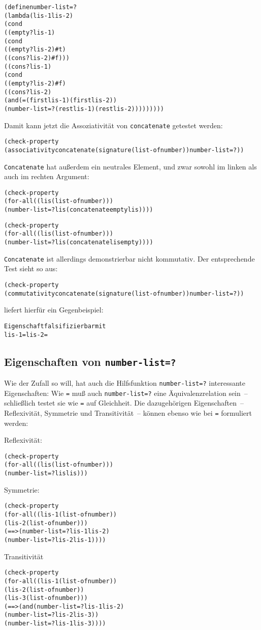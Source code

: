 %
\begin{alltt}
(define number-list=?
  (lambda (lis-1 lis-2)
    (cond
      ((empty? lis-1)
       (cond
         ((empty? lis-2) #t)
         ((cons? lis-2) #f)))
      ((cons? lis-1)
       (cond
         ((empty? lis-2) #f)
         ((cons? lis-2)
          (and (= (first lis-1) (first lis-2))
               (number-list=? (rest lis-1) (rest lis-2)))))))))
\end{alltt}
%
Damit kann jetzt die Assoziativität von \texttt{concatenate} getestet werden:
%
\begin{alltt}
(check-property
 (associativity concatenate (signature (list-of number)) number-list=?))
\end{alltt}
%
\texttt{Concatenate} hat außerdem ein neutrales Element, und zwar
sowohl im linken als auch im rechten Argument:
%
\begin{alltt}
(check-property
 (for-all ((lis (list-of number)))
   (number-list=? lis (concatenate empty lis))))

(check-property
 (for-all ((lis (list-of number)))
   (number-list=? lis (concatenate lis empty))))
\end{alltt}
%
\texttt{Concatenate} ist allerdings demonstrierbar nicht kommutativ.
Der entsprechende Test sieht so aus:
%
\begin{alltt}
(check-property
 (commutativity concatenate (signature (list-of number)) number-list=?))
\end{alltt}
%
\drscheme{} liefert hierfür ein Gegenbeispiel:
%
\begin{alltt}
Eigenschaft falsifizierbar mit
         lis-1 =  lis-2 = 
\end{alltt}

\subsection{Eigenschaften von \texttt{number-list=?}}

Wie der Zufall so will, hat auch die Hilfsfunktion
\texttt{number-list=?} interessante Eigenschaften: Wie \texttt{=} muß
auch \texttt{number-list=?} eine Äquivalenzrelation sein~--
schließlich testet sie wie \texttt{=} auf Gleichheit.  Die
dazugehörigen Eigenschaften~-- Reflexivität, Symmetrie und
Transitivität~-- können ebenso wie bei \texttt{=} formuliert werden:

Reflexivität:
%
\begin{alltt}
(check-property
 (for-all ((lis (list-of number)))
   (number-list=? lis lis)))
\end{alltt}
Symmetrie:
\begin{alltt}
(check-property
  (for-all ((lis-1 (list-of number))
            (lis-2 (list-of number)))
    (==> (number-list=? lis-1 lis-2)
         (number-list=? lis-2 lis-1))))
\end{alltt}
 Transitivität
\begin{alltt}
(check-property
 (for-all ((lis-1 (list-of number))
           (lis-2 (list-of number))
           (lis-3 (list-of number)))
   (==> (and (number-list=? lis-1 lis-2)
             (number-list=? lis-2 lis-3))
        (number-list=? lis-1 lis-3))))
\end{alltt}
%

